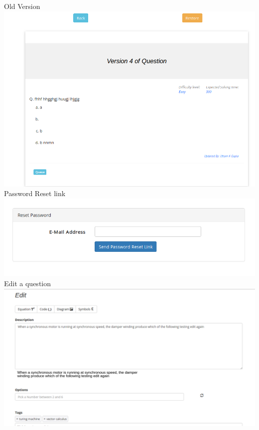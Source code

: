 \documentclass[a4paper,12pt,oneside]{book}
\begin{document}
Old Version\\
\includegraphics[scale=0.4]{version3.png}	\\

\vspace{2in}
Password Reset link \\
\includegraphics[scale=0.4]{password.png}	\\

\vspace{1in}
Edit a question \\
\includegraphics[scale=0.4]{edit.png}	\\
\end{document}
